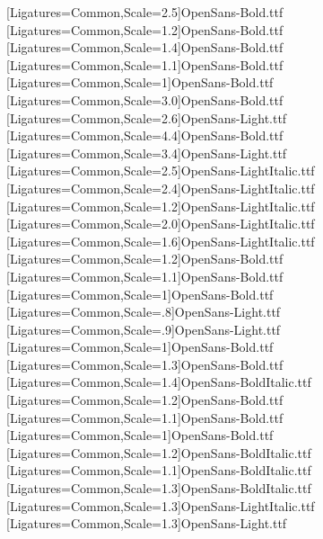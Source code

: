\setsansfont[Ligatures=Common,Scale=1,SlantedFont={OpenSans-LightItalic.ttf},BoldFont={OpenSans-Bold.ttf},BoldSlantedFont={OpenSans-BoldItalic.ttf}]{OpenSans-Light.ttf} %
\newfontface{\sfbHugeRomeo}[Ligatures=Common,Scale=2.5]{OpenSans-Bold.ttf}
\newfontface{\cmssbxparttocRomeo}[Ligatures=Common,Scale=1.2]{OpenSans-Bold.ttf}
\newfontface{\cmssbxsectionRomeo}[Ligatures=Common,Scale=1.4]{OpenSans-Bold.ttf}
\newfontface{\cmssbxelevenRomeo}[Ligatures=Common,Scale=1.1]{OpenSans-Bold.ttf}
\newfontface{\cmssbxchaptocRomeo}[Ligatures=Common,Scale=1]{OpenSans-Bold.ttf}
\newfontface{\cmssbxchaptitleRomeo}[Ligatures=Common,Scale=3.0]{OpenSans-Bold.ttf}
\newfontface{\cmsschapnameRomeo}[Ligatures=Common,Scale=2.6]{OpenSans-Light.ttf}
\newfontface{\cmssbxpartRomeo}[Ligatures=Common,Scale=4.4]{OpenSans-Bold.ttf}
\newfontface{\cmssparttitleRomeo}[Ligatures=Common,Scale=3.4]{OpenSans-Light.ttf}
\newfontface{\sfiHugeRomeo}[Ligatures=Common,Scale=2.5]{OpenSans-LightItalic.ttf}
\newfontface{\sfititleRomeo}[Ligatures=Common,Scale=2.4]{OpenSans-LightItalic.ttf}
\newfontface{\sfitwelveRomeo}[Ligatures=Common,Scale=1.2]{OpenSans-LightItalic.ttf}
\newfontface{\sfihalftitleRomeo}[Ligatures=Common,Scale=2.0]{OpenSans-LightItalic.ttf}
\newfontface{\sfiauthorRomeo}[Ligatures=Common,Scale=1.6]{OpenSans-LightItalic.ttf}
\newfontface{\sfblargeRomeo}[Ligatures=Common,Scale=1.2]{OpenSans-Bold.ttf}
\newfontface{\sfbelevenRomeo}[Ligatures=Common,Scale=1.1]{OpenSans-Bold.ttf}
\newfontface{\sfbRomeo}[Ligatures=Common,Scale=1]{OpenSans-Bold.ttf}
\newfontface{\sfeightRomeo}[Ligatures=Common,Scale=.8]{OpenSans-Light.ttf}
\newfontface{\sfnineRomeo}[Ligatures=Common,Scale=.9]{OpenSans-Light.ttf}
[Ligatures=Common,Scale=1]{OpenSans-Bold.ttf}
\newfontface{\sfbsectionRomeo}[Ligatures=Common,Scale=1.3]{OpenSans-Bold.ttf}
\newfontface{\sfbsectionitalRomeo}[Ligatures=Common,Scale=1.4]{OpenSans-BoldItalic.ttf}
\newfontface{\sfbsubsecRomeo}[Ligatures=Common,Scale=1.2]{OpenSans-Bold.ttf}
\newfontface{\sfbsubsubRomeo}[Ligatures=Common,Scale=1.1]{OpenSans-Bold.ttf}
\newfontface{\sfbparaRomeo}[Ligatures=Common,Scale=1]{OpenSans-Bold.ttf}
\newfontface{\sfbsubsecitalRomeo}[Ligatures=Common,Scale=1.2]{OpenSans-BoldItalic.ttf}
\newfontface{\sfbsubsubsecitalRomeo}[Ligatures=Common,Scale=1.1]{OpenSans-BoldItalic.ttf}
\newfontface{\sfbiRHRomeo}[Ligatures=Common,Scale=1.3]{OpenSans-BoldItalic.ttf}
\newfontface{\sfiRHRomeo}[Ligatures=Common,Scale=1.3]{OpenSans-LightItalic.ttf}
\newfontface{\sfRHRomeo}[Ligatures=Common,Scale=1.3]{OpenSans-Light.ttf}


